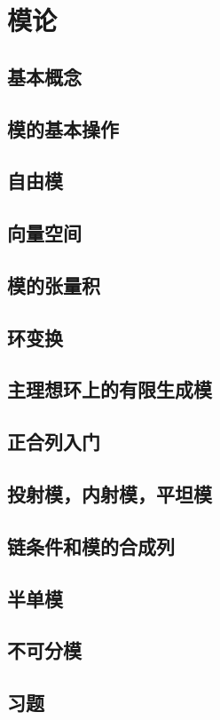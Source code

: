 \chapter{模论}

\section{基本概念}
\section{模的基本操作}
\section{自由模}
\section{向量空间}
\section{模的张量积}
\section{环变换}
\section{主理想环上的有限生成模}
\section{正合列入门}
\section{投射模，内射模，平坦模}
\section{链条件和模的合成列}
\section{半单模}
\section{不可分模}
\section*{习题}
